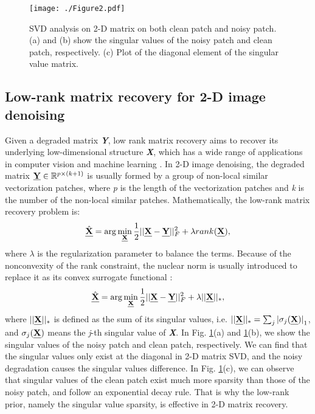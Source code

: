 \documentclass[twocolumn]{svjour3}          %
\begin{document}
\begin{figure}
    \texttt{[image: ./Figure2.pdf]}
   \caption{SVD analysis on 2-D matrix on both clean patch and noisy patch. (a) and (b) show the singular values of the noisy patch and clean patch, respectively. (c) Plot of the diagonal element of the singular value matrix.}
\label{Matrix SVD}
\end{figure}

  \subsection{Low-rank matrix recovery for 2-D image denoising}
    Given a degraded matrix \textbf{\emph{Y}}, low rank matrix recovery aims to recover its underlying low-dimensional structure \textbf{\emph{X}}, which has a wide range of applications in computer vision and machine learning \cite{candes2011robust}. In 2-D image denoising, the degraded matrix $\emph{\textbf{Y}} \in {\mathbb{R}^{p \times (k + 1)}}$ is usually formed by a group of non-local similar vectorization patches, where \emph{p} is the length of the vectorization patches and \emph{k} is the number of the non-local similar patches. Mathematically, the low-rank matrix recovery problem is:
    \begin{equation}\label{eq:LRMR_Original}
    \setlength{\abovedisplayskip}{2pt}
    \setlength{\belowdisplayskip}{2pt}
    \hat{\textbf{\emph{X}}} = \arg \mathop {\min }\limits_\textbf{\emph{X}} \frac{1}{2}||\textbf{\emph{X}} - \textbf{\emph{Y}}||_F^2 + \lambda rank(\textbf{\emph{X}}),
    \end{equation}
    where $\lambda$ is the regularization parameter to balance the terms. Because of the nonconvexity of the rank constraint, the nuclear norm is usually introduced to replace it as its convex surrogate functional \cite{fazel2002matrix}:
    \begin{equation}\label{eq:LRMR_Transformed}
    \setlength{\abovedisplayskip}{2pt}
    \setlength{\belowdisplayskip}{2pt}
    \hat{\textbf{\emph{X}}} = \arg \mathop {\min }\limits_\textbf{\emph{X}} \frac{1}{2}||\textbf{\emph{X}} - \textbf{\emph{Y}}||_F^2 + \lambda ||\textbf{\emph{X}}|{|_ * },
    \end{equation}
    where $||\textbf{\emph{X}}|{|_*}$ is defined as the sum of its singular values, i.e. $||\textbf{\emph{X}}|{|_ * } = {\sum\nolimits_j {|{\sigma _j}(\textbf{\emph{X}})|}_1}$, and ${\sigma _j}(\textbf{\emph{X}})$ means the \emph{j}-th singular value of \textbf{\emph{X}}. In Fig. \ref{Matrix SVD}(a) and  \ref{Matrix SVD}(b), we show the singular values of the noisy patch and clean patch, respectively. We can find that the singular values only exist at the diagonal in 2-D matrix SVD, and the noisy degradation causes the singular values difference. In Fig. \ref{Matrix SVD}(c), we can observe that singular values of the clean patch exist much more sparsity than those of the noisy patch, and follow an exponential decay rule. That is why the low-rank prior, namely the singular value sparsity, is effective in 2-D matrix recovery.
\end{document}
